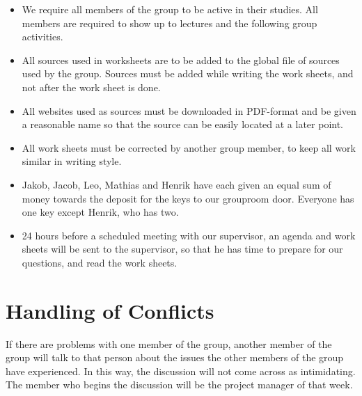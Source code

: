 \documentclass[a4paper,12pt,hidelinks]{article}
\begin{document}
\begin{itemize}
\begin{itemize}
		\end{itemize}
		\item We require all members of the group to be active in their studies. All members are required to show up to lectures and the following group activities.
		\item All sources used in worksheets are to be added to the global file of sources used by the group. Sources must be added while writing the work sheets, and not after the work sheet is done. 
		\item All websites used as sources must be downloaded in PDF-format and be given a reasonable name so that the source can be easily located at a later point.
		\item All work sheets must be corrected by another group member, to keep all work similar in writing style.
		\item Jakob, Jacob, Leo, Mathias and Henrik have each given an equal sum of money towards the deposit for the keys to our grouproom door. Everyone has one key except Henrik, who has two.
	\end{itemize}

	\begin{itemize}
		\item 24 hours before a scheduled meeting with our supervisor, an agenda and work sheets will be sent to the supervisor, so that he has time to prepare for our questions, and read the work sheets.
	\end{itemize}
	\section*{Handling of Conflicts}
	If there are problems with one member of the group, another member of the group will talk to that person about the issues the other members of the group have experienced. In this way, the discussion will not come across as intimidating. The member who begins the discussion will be the project manager of that week.
\end{document}

